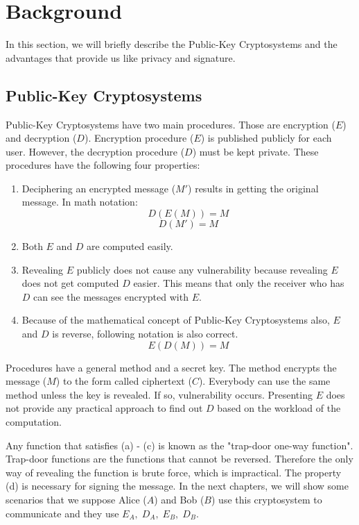 \documentclass[12pt, letterpaper]{article}
\begin{document}
\section{Background}

In this section, we will briefly describe the Public-Key Cryptosystems and the advantages that provide us like privacy and signature.

\subsection{Public-Key Cryptosystems}

Public-Key Cryptosystems have two main procedures. Those are encryption ($E$) and decryption ($D$). Encryption procedure ($E$) is published publicly for each user. However, the decryption procedure ($D$) must be kept private. These procedures have the following four properties:

\renewcommand{\theenumi}{\alph{enumi}}
\begin{enumerate}
\item   
Deciphering an encrypted message ($M'$) results in getting the original message. In math notation:
\begin{equation}
D(E(M)) = M
\end{equation}
\[ D(M') = M \]   
    
\item
Both $E$ and $D$ are computed easily.

\item
Revealing $E$ publicly does not cause any vulnerability because revealing $E$ does not get computed $D$ easier. This means that only the receiver who has $D$ can see the messages encrypted with $E$.

\item
Because of the mathematical concept of Public-Key Cryptosystems also, $E$ and $D$ is reverse, following notation is also correct.
\begin{equation}
E(D(M)) = M
\end{equation}
\end{enumerate}

Procedures have a general method and a secret key. The method encrypts the message ($M$) to the form called ciphertext ($C$). Everybody can use the same method unless the key is revealed. If so, vulnerability occurs. Presenting $E$ does not provide any practical approach to find out $D$ based on the workload of the computation.

Any function that satisfies (a) - (c) is known as the "trap-door one-way function". Trap-door functions are the functions that cannot be reversed. Therefore the only way of revealing the function is brute force, which is impractical. The property (d) is necessary for signing the message. In the next chapters, we will show some scenarios that we suppose Alice ($A$) and Bob ($B$) use this cryptosystem to communicate and they use $E_A, \; D_A, \; E_B, \; D_B$.
\end{document}
